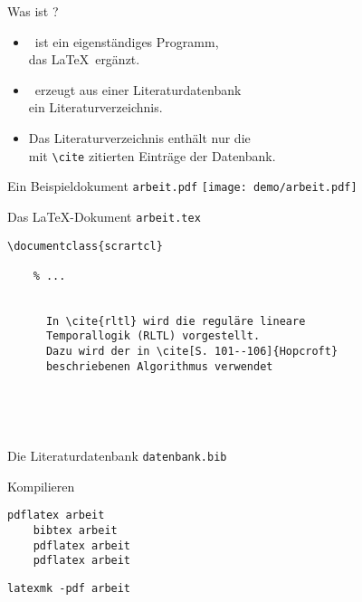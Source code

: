 \begin{Frame}[fragile]{Was ist \BibTeX?}
  \begin{itemize}
    \item \BibTeX\ ist ein \alert{eigenständiges Programm},\\
    das \LaTeX\ ergänzt.
    \item \BibTeX\ erzeugt aus einer \alert{Literaturdatenbank}\\
      ein \alert{Literaturverzeichnis}.
    \item Das Literaturverzeichnis enthält \alert{nur} die\\
      mit \lstinline-\cite- \alert{zitierten Einträge} der Datenbank.
  \end{itemize}
\end{Frame}

\begin{Frame}[t]{Ein Beispieldokument \texttt{arbeit.pdf}}
  \texttt{[image: demo/arbeit.pdf]}
\end{Frame}

\begin{Frame}[fragile]{Das \LaTeX-Dokument \texttt{arbeit.tex}}
  \begin{lstlisting}[gobble=4]
    \documentclass{scrartcl}
    
    % ...
    
    
      In \cite{rltl} wird die reguläre lineare
      Temporallogik (RLTL) vorgestellt.
      Dazu wird der in \cite[S. 101--106]{Hopcroft}
      beschriebenen Algorithmus verwendet

      
      
    
  \end{lstlisting}
\end{Frame}

\begin{Frame}{Die Literaturdatenbank \texttt{datenbank.bib}}
  
\end{Frame}

\begin{Frame}[fragile]{Kompilieren}
  \begin{lstlisting}[language={},morekeywords={pdflatex,bibtex},gobble=4]
    pdflatex arbeit
    bibtex arbeit
    pdflatex arbeit
    pdflatex arbeit
  \end{lstlisting}

  \xxx
  \pause


  \begin{lstlisting}[language={},morekeywords={latexmk},gobble=4]
    latexmk -pdf arbeit
  \end{lstlisting}
\end{Frame}

